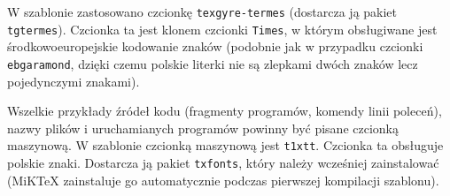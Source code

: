 W szablonie zastosowano czcionkę \texttt{texgyre-termes} (dostarcza ją pakiet \texttt{tgtermes}). Czcionka ta jest klonem czcionki \texttt{Times}, w którym obsługiwane jest środkowoeuropejskie kodowanie znaków (podobnie jak w przypadku czcionki \texttt{ebgaramond}, dzięki czemu polskie literki nie są zlepkami dwóch znaków lecz pojedynczymi znakami).

Wszelkie przykłady źródeł kodu (fragmenty programów, komendy linii poleceń), nazwy plików i uruchamianych programów powinny być pisane czcionką maszynową. W szablonie czcionką maszynową jest \texttt{t1xtt}. Czcionka ta obsługuje polskie znaki. Dostarcza ją pakiet \texttt{txfonts}, który należy wcześniej zainstalować (MiKTeX zainstaluje go automatycznie podczas pierwszej kompilacji szablonu).



